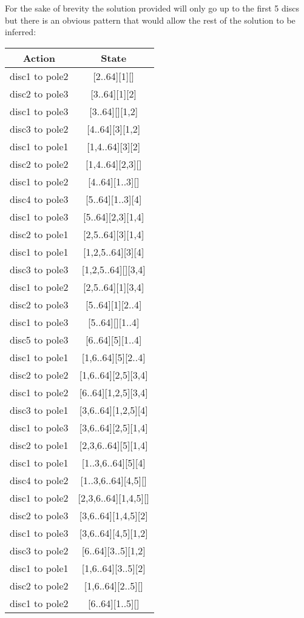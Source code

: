 \documentclass[12pt]{article}
\begin{document}
For the sake of brevity the solution provided will only go up to the first 5 discs but there is an obvious pattern that would allow the rest of the solution to be inferred:

\begin{center}
\begin{tabular}{c|c}
  \textbf{Action} & \textbf{State}  \\ \hline
  disc1 to pole2 & [2..64][1][]     \\ \hline
  disc2 to pole3 & [3..64][1][2]     \\ \hline
  disc1 to pole3 & [3..64][][1,2]     \\ \hline
  disc3 to pole2 & [4..64][3][1,2]     \\ \hline
  disc1 to pole1 & [1,4..64][3][2]     \\ \hline
  disc2 to pole2 & [1,4..64][2,3][]     \\ \hline
  disc1 to pole2 & [4..64][1..3][]     \\ \hline
  disc4 to pole3 & [5..64][1..3][4]     \\ \hline
  disc1 to pole3 & [5..64][2,3][1,4]     \\ \hline
  disc2 to pole1 & [2,5..64][3][1,4]     \\ \hline
  disc1 to pole1 & [1,2,5..64][3][4]     \\ \hline
  disc3 to pole3 & [1,2,5..64][][3,4]     \\ \hline
  disc1 to pole2 & [2,5..64][1][3,4]     \\ \hline
  disc2 to pole3 & [5..64][1][2..4]     \\ \hline
  disc1 to pole3 & [5..64][][1..4]     \\ \hline
  disc5 to pole3 & [6..64][5][1..4]     \\ \hline
  disc1 to pole1 & [1,6..64][5][2..4]     \\ \hline
  disc2 to pole2 & [1,6..64][2,5][3,4]     \\ \hline
  disc1 to pole2 & [6..64][1,2,5][3,4]     \\ \hline
  disc3 to pole1 & [3,6..64][1,2,5][4]     \\ \hline
  disc1 to pole3 & [3,6..64][2,5][1,4]     \\ \hline
  disc2 to pole1 & [2,3,6..64][5][1,4]     \\ \hline
  disc1 to pole1 & [1..3,6..64][5][4]     \\ \hline
  disc4 to pole2 & [1..3,6..64][4,5][]     \\ \hline
  disc1 to pole2 & [2,3,6..64][1,4,5][]     \\ \hline
  disc2 to pole3 & [3,6..64][1,4,5][2]     \\ \hline
  disc1 to pole3 & [3,6..64][4,5][1,2]     \\ \hline
  disc3 to pole2 & [6..64][3..5][1,2]     \\ \hline
  disc1 to pole1 & [1,6..64][3..5][2]     \\ \hline
  disc2 to pole2 & [1,6..64][2..5][]     \\ \hline
  disc1 to pole2 & [6..64][1..5][]     \\ \hline
\end{tabular}
\end{center}
\end{document}
